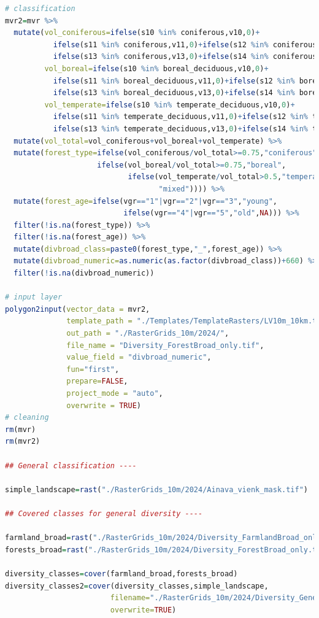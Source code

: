 \documentclass[
]{book}
\begin{document}
\begin{lstlisting}[language=R]
# classification
mvr2=mvr %>% 
  mutate(vol_coniferous=ifelse(s10 %in% coniferous,v10,0)+
           ifelse(s11 %in% coniferous,v11,0)+ifelse(s12 %in% coniferous,v12,0)+
           ifelse(s13 %in% coniferous,v13,0)+ifelse(s14 %in% coniferous,v14,0),
         vol_boreal=ifelse(s10 %in% boreal_deciduous,v10,0)+
           ifelse(s11 %in% boreal_deciduous,v11,0)+ifelse(s12 %in% boreal_deciduous,v12,0)+
           ifelse(s13 %in% boreal_deciduous,v13,0)+ifelse(s14 %in% boreal_deciduous,v14,0),
         vol_temperate=ifelse(s10 %in% temperate_deciduous,v10,0)+
           ifelse(s11 %in% temperate_deciduous,v11,0)+ifelse(s12 %in% temperate_deciduous,v12,0)+
           ifelse(s13 %in% temperate_deciduous,v13,0)+ifelse(s14 %in% temperate_deciduous,v14,0)) %>% 
  mutate(vol_total=vol_coniferous+vol_boreal+vol_temperate) %>% 
  mutate(forest_type=ifelse(vol_coniferous/vol_total>=0.75,"coniferous",
                     ifelse(vol_boreal/vol_total>=0.75,"boreal",
                            ifelse(vol_temperate/vol_total>0.5,"temperate",
                                   "mixed")))) %>% 
  mutate(forest_age=ifelse(vgr=="1"|vgr=="2"|vgr=="3","young",
                           ifelse(vgr=="4"|vgr=="5","old",NA))) %>% 
  filter(!is.na(forest_type)) %>% 
  filter(!is.na(forest_age)) %>% 
  mutate(divbroad_class=paste0(forest_type,"_",forest_age)) %>% 
  mutate(divbroad_numeric=as.numeric(as.factor(divbroad_class))+660) %>% 
  filter(!is.na(divbroad_numeric))

# input layer
polygon2input(vector_data = mvr2,
              template_path = "./Templates/TemplateRasters/LV10m_10km.tif",
              out_path = "./RasterGrids_10m/2024/",
              file_name = "Diversity_ForestBroad_only.tif",
              value_field = "divbroad_numeric",
              fun="first",
              prepare=FALSE,
              project_mode = "auto",
              overwrite = TRUE)
# cleaning
rm(mvr)
rm(mvr2)

## General classification ----

simple_landscape=rast("./RasterGrids_10m/2024/Ainava_vienk_mask.tif")

## Covered classes for general diversity ----

farmland_broad=rast("./RasterGrids_10m/2024/Diversity_FarmlandBroad_only.tif")
forests_broad=rast("./RasterGrids_10m/2024/Diversity_ForestBroad_only.tif")

diversity_classes=cover(farmland_broad,forests_broad)
diversity_classes2=cover(diversity_classes,simple_landscape,
                        filename="./RasterGrids_10m/2024/Diversity_GeneralLandscapeBroad.tif",
                        overwrite=TRUE)


\end{lstlisting}
\end{document}
